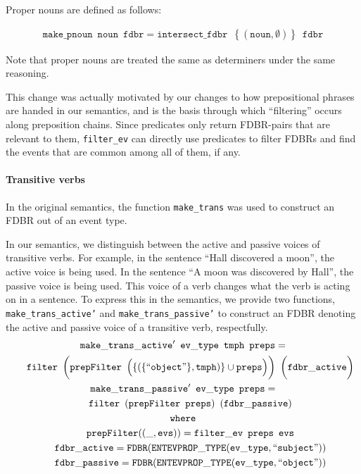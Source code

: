 \documentclass[../main.tex]{subfiles}
\begin{document}
Proper nouns are defined as follows:

\begin{gather*}
\mathtt{make\_pnoun}\enspace \mathtt{noun}\enspace \mathtt{fdbr} = \mathtt{intersect\_fdbr}\enspace \left\{(\mathtt{noun}, \mathtt{\emptyset})\right\} \enspace\mathtt{fdbr}
\end{gather*}

Note that proper nouns are treated the same as determiners under the same reasoning.

This change was actually motivated by our changes to how prepositional phrases are handed in our semantics, and is the basis through which
``filtering'' occurs along preposition chains.  Since predicates only return FDBR-pairs that are relevant to them, \texttt{filter\_ev} can directly
use predicates to filter FDBRs and find the events that are common among all of them, if any.

\paragraph{Transitive verbs}

In the original semantics, the function \texttt{make\_trans} was used to
construct an FDBR out of an event type.

In our semantics, we distinguish between the active and passive voices of transitive verbs.  For example, in the sentence ``Hall discovered a moon'', the active voice is being used.
In the sentence ``A moon was discovered by Hall'', the passive voice is being
used.  This voice of a verb changes what the verb is acting on in  a sentence.  To express this in the semantics,
we provide two functions, \texttt{make\_trans\_active'} and \texttt{make\_trans\_passive'} to construct an FDBR denoting the active and passive voice of a transitive verb, respectfully.\\
{\setlength{\mathindent}{0cm}
\begin{gather*}
\mathtt{make\_trans\_active'}\enspace \mathtt{ev\_type}\enspace \mathtt{tmph}\enspace \mathtt{preps} = \\
	\mathtt{\indent filter}\enspace \bigg(\mathtt{prepFilter}\enspace \Big(\{(\{\text{``\texttt{object}''}\}, \mathtt{tmph})\} \cup \mathtt{preps}\Big)\bigg)\enspace \bigg(\mathtt{fdbr\_active}\bigg) \\
\mathtt{make\_trans\_passive'}\enspace \mathtt{ev\_type}\enspace \mathtt{preps} = \\
	\mathtt{\indent filter}\enspace (\mathtt{prepFilter}\enspace \mathtt{preps})\enspace (\mathtt{fdbr\_passive}) \\
\mathtt{ where} \\
\mathtt{\indent prepFilter} ((\_, \mathtt{evs})) = \mathtt{filter\_ev}\enspace \mathtt{preps}\enspace \mathtt{evs} \\
\mathtt{\indent fdbr\_active} = \mathtt{FDBR}(\mathtt{ENTEVPROP\_TYPE}(\mathtt{ev\_type}, \text{``\texttt{subject}''})) \\
\mathtt{\indent fdbr\_passive} = \mathtt{FDBR}(\mathtt{ENTEVPROP\_TYPE}(\mathtt{ev\_type}, \text{``\texttt{object}''}))
\end{gather*}
}
\end{document}
